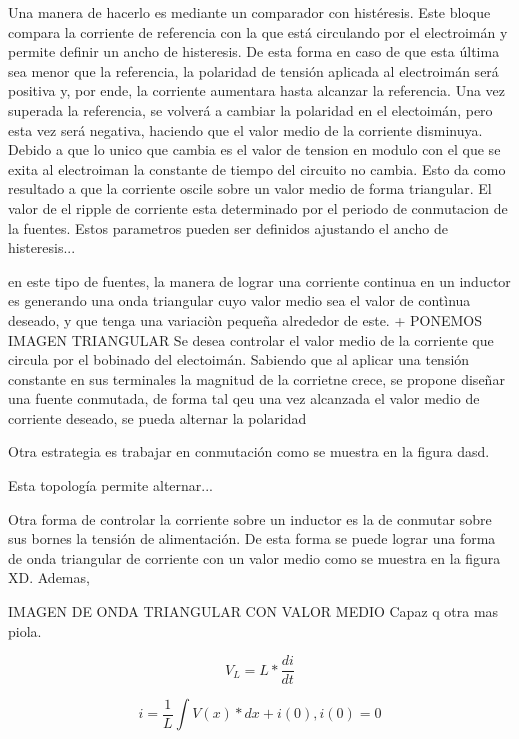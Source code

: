 Una manera de hacerlo es mediante un comparador con histéresis. Este bloque compara la corriente de referencia con la que está circulando por el electroimán y permite definir un ancho de histeresis. De esta forma en caso de que esta última sea menor que la referencia, la polaridad de tensión aplicada al electroimán será positiva y, por ende, la corriente aumentara hasta alcanzar la referencia. Una vez superada la referencia, se volverá a cambiar la polaridad en el electoimán, pero esta vez será negativa, haciendo que el valor medio de la corriente disminuya. Debido a que lo unico que cambia es el valor de tension en modulo con el que se exita al electroiman la constante de tiempo del circuito no cambia. Esto da como resultado a que la corriente oscile sobre un valor medio de forma triangular. El valor de el ripple de corriente esta determinado por el periodo de conmutacion de la fuentes. Estos parametros pueden ser definidos ajustando el ancho de histeresis...

en este tipo de fuentes, la manera de lograr una corriente continua en un inductor es generando una onda triangular cuyo valor medio sea el valor de contìnua deseado, y que tenga una variaciòn pequeña alrededor de este. 
+
PONEMOS IMAGEN TRIANGULAR
Se desea controlar el valor medio de la corriente que circula por el bobinado del electoimán. Sabiendo que al aplicar una tensión constante en sus terminales la magnitud de la corrietne crece, se propone diseñar una fuente conmutada, de forma tal qeu una vez alcanzada el valor medio de corriente deseado, se pueda alternar la polaridad 

Otra estrategia es trabajar en conmutación como se muestra en la figura dasd.

Esta topología permite alternar...

Otra forma de controlar la corriente sobre un inductor es la de conmutar sobre sus bornes la tensión de alimentación. De esta forma se puede lograr una forma de onda triangular de corriente con un valor medio como se muestra en la figura XD. Ademas,

IMAGEN DE ONDA TRIANGULAR CON VALOR MEDIO Capaz q otra mas piola.


\begin{equation}
V_{L} =L*\frac{di}{dt}
\end{equation}

\begin{equation}
i =\frac{1}{L}\int{V(x)*dx}+i(0) , i(0)=0
\end{equation}

